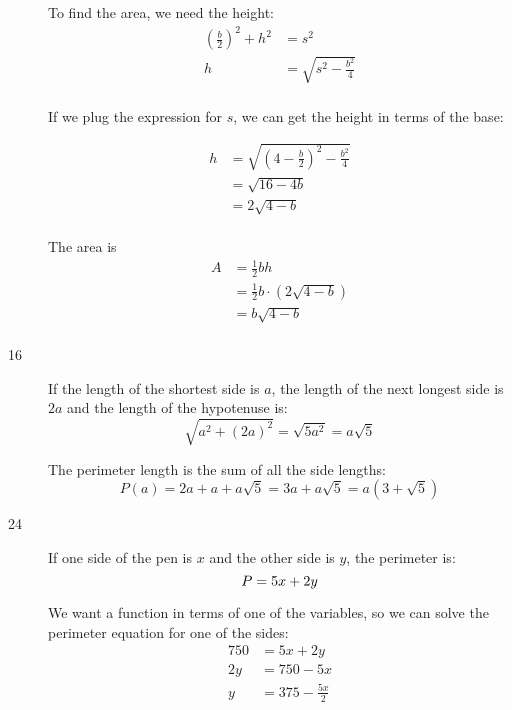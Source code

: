 \documentclass{exam}
\begin{document}
\begin{description}
      To find the area, we need the height:
      \begin{align*}
        \left( \frac{b}{2} \right)^2 + h^2 &= s^2 \\
        h                                  &= \sqrt{s^2 - \frac{b^2}{4}} \\
      \end{align*}

      If we plug the expression for $s$, we can get the height in terms of the base:

      \begin{align*}
        h &= \sqrt{\left( 4 - \frac{b}{2} \right)^2 - \frac{b^2}{4}} \\
          &= \sqrt{16 - 4b} \\
          &= 2 \sqrt{4 - b} \\
      \end{align*}

      The area is
      \begin{align*}
        A &= \frac{1}{2} bh \\
          &= \frac{1}{2} b \cdot (2 \sqrt{4 - b}) \\
          &= b \sqrt{4 - b} \\
      \end{align*}

    \item[16]
      If the length of the shortest side is $a$, the length of the next longest side is $2a$ and the length of the
      hypotenuse is:
      \[
        \sqrt{a^2 + (2a)^2} = \sqrt{5a^2} = a \sqrt{5}
      \]

      The perimeter length is the sum of all the side lengths:
      \[
        P(a) = 2a + a + a \sqrt{5} = 3a + a \sqrt{5} = a(3 + \sqrt{5})
      \]

    \item[24]
      If one side of the pen is $x$ and the other side is $y$, the perimeter is:
      \[
        P = 5x + 2y \\
      \]

      We want a function in terms of one of the variables, so we can solve the perimeter equation for one of the sides:
      \begin{align*}
        750 &= 5x + 2y \\
        2y  &= 750 - 5x \\
        y   &= 375 - \frac{5x}{2} \\
      \end{align*}


\end{description}
\end{document}
